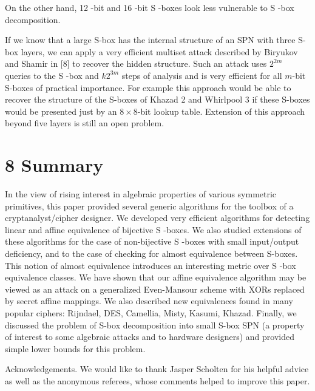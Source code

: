 \documentclass[10pt]{article}
\begin{document}
On the other hand, 12 -bit and 16 -bit S -boxes look less vulnerable to S -box decomposition.

If we know that a large S-box has the internal structure of an SPN with three S-box layers, we can apply a very efficient multiset attack described by Biryukov and Shamir in [8] to recover the hidden structure. Such an attack uses $2^{2 m}$ queries to the S -box and $k 2^{3 m}$ steps of analysis and is very efficient for all $m$-bit S-boxes of practical importance. For example this approach would be able to recover the structure of the S-boxes of Khazad 2 and Whirlpool 3 if these S-boxes would be presented just by an $8 \times 8$-bit lookup table. Extension of this approach beyond five layers is still an open problem.

\section*{8 Summary}
In the view of rising interest in algebraic properties of various symmetric primitives, this paper provided several generic algorithms for the toolbox of a cryptanalyst/cipher designer. We developed very efficient algorithms for detecting linear and affine equivalence of bijective S -boxes. We also studied extensions of these algorithms for the case of non-bijective S -boxes with small input/output deficiency, and to the case of checking for almost equivalence between S-boxes. This notion of almost equivalence introduces an interesting metric over S -box equivalence classes. We have shown that our affine equivalence algorithm may be viewed as an attack on a generalized Even-Mansour scheme with XORs replaced by secret affine mappings. We also described new equivalences found in many popular ciphers: Rijndael, DES, Camellia, Misty, Kasumi, Khazad. Finally, we discussed the problem of S-box decomposition into small S-box SPN (a property of interest to some algebraic attacks and to hardware designers) and provided simple lower bounds for this problem.

Acknowledgements. We would like to thank Jasper Scholten for his helpful advice as well as the anonymous referees, whose comments helped to improve this paper.
\end{document}
